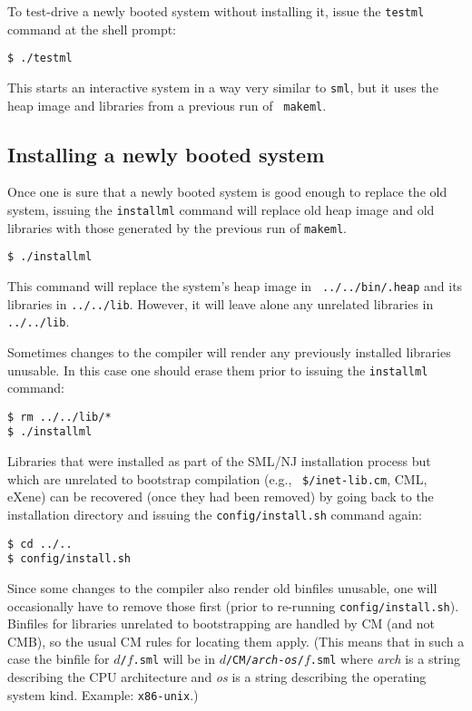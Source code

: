 To test-drive a newly booted system without installing it, issue the
{\tt testml} command at the shell prompt:

\begin{verbatim}
$ ./testml
\end{verbatim}

This starts an interactive system in a way very similar to {\tt sml},
but it uses the heap image and libraries from a previous run of {\tt
makeml}.

\subsection{Installing a newly booted system}

Once one is sure that a newly booted system is good enough to replace
the old system, issuing the {\tt installml} command will replace old
heap image and old libraries with those generated by the previous run
of {\tt makeml}.

\begin{verbatim}
$ ./installml
\end{verbatim}

This command will replace the system's heap image in {\tt
../../bin/.heap} and its libraries in {\tt ../../lib}.  However, it
will leave alone any unrelated libraries in {\tt ../../lib}.

Sometimes changes to the compiler will render any previously installed
libraries unusable.  In this case one should erase them prior to
issuing the {\tt installml} command:

\begin{verbatim}
$ rm ../../lib/*
$ ./installml
\end{verbatim}

Libraries that were installed as part of the SML/NJ installation
process but which are unrelated to bootstrap compilation (e.g., {\tt
\$/inet-lib.cm}, CML, eXene) can be recovered (once they had been
removed) by going back to the installation directory and issuing the
{\tt config/install.sh} command again:

\begin{verbatim}
$ cd ../..
$ config/install.sh
\end{verbatim}

Since some changes to the compiler also render old binfiles unusable,
one will occasionally have to remove those first (prior to re-running
{\tt config/install.sh}).  Binfiles for libraries unrelated to
bootstrapping are handled by CM (and not CMB), so the usual CM rules
for locating them apply.  (This means that in such a case the binfile
for {\tt $d$/$f$.sml} will be in
{\tt $d$/CM/{\it arch}-{\it os}/$f$.sml}
where {\it arch} is a string describing the CPU
architecture and {\it os} is a string describing the operating system
kind.  Example: {\tt x86-unix}.)
